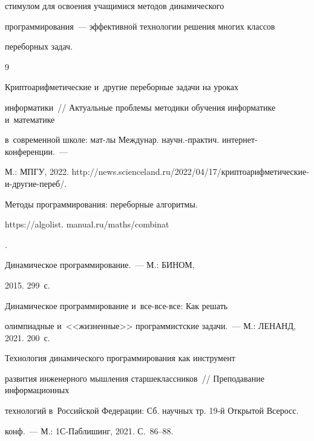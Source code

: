 стимулом для освоения учащимися методов динамического 


программирования~--- эффективной технологии решения многих классов 


переборных задач. 


    


 {\small\frenchspacing


{%




\begin{thebibliography}{9}




 Криптоарифметические и~другие переборные задачи на уроках 


информатики~/\!\!/ Актуальные проблемы методики обучения информатике и~математике 


в~современной школе: мат-лы Междунар. научн.-практич. ин\-тер\-нет-кон\-фе\-рен\-ции.~--- 


М.: МПГУ, 2022. {\sf http://news.scienceland.ru/2022/04/17/криптоарифметические-и-другие-переб/}. 




 Методы программирования: переборные алгоритмы. {\sf 


https://algolist. manual.ru/maths/combinat}.







 Динамическое программирование.~--- М.: БИНОМ, 


 2015. 299~с.




 Динамическое программирование и~все-все-все: Как решать 


олимпиадные и~<<жизненные>> программистские задачи.~--- М.: ЛЕНАНД, 2021. 200~с. 




 Технология динамического программирования как инструмент 


развития инженерного мышления старшеклассников~/\!\!/ Преподавание информационных 


технологий в~Российской Федерации: Сб. научных тр. 19-й Открытой Всеросс. 


конф.~--- М.: 1С-Паб\-ли\-шинг, 2021. С.~86--88.






\end{thebibliography}}}
